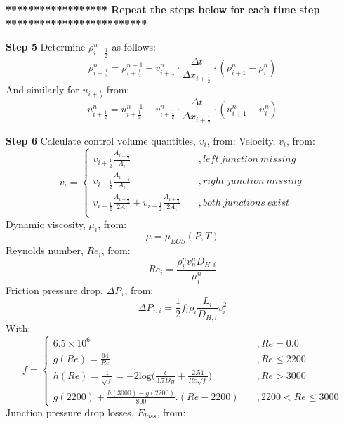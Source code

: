 \documentclass[11pt,letterpaper,titlepage]{article}
\newcommand{\half}{\frac{1}{2}}
\begin{document}
\newpage
\vspace{0.5cm}\noindent
\textbf{****************** Repeat the steps below for each time step *************************}\newline


\vspace{0.5cm}\noindent
\textbf{Step 5}\newline
Determine $\rho_{i+\half}^n$ as follows:
\begin{equation*}
\rho_{i+\half}^n = \rho_{i+\half}^{n-1} - v_{i+\half}^n \cdot \frac{\Delta t}{\Delta x_{i+\half}} \cdot (\rho_{i+1}^n-\rho_i^n)
\end{equation*}
And similarly for $u_{i+\half}$ from:
\begin{equation*}
u_{i+\half}^n = u_{i+\half}^{n-1} - v_{i+\half}^n \cdot \frac{\Delta t}{\Delta x_{i+\half}} \cdot (u_{i+1}^n-u_i^n)
\end{equation*}



\vspace{0.5cm}\noindent
\textbf{Step 6}\newline
Calculate control volume quantities, $v_i$, from:
Velocity, $v_i$, from:
\begin{equation*}
v_i=
\begin{cases}
v_{i+\half} \frac{A_{i+\half}}{A_i} \quad &, left \ junction  \ missing \\
v_{i-\half} \frac{A_{i-\half}}{A_i} \quad &, right \ junction  \ missing \\
v_{i-\half} \frac{A_{i-\half}}{2A_i} + v_{i+\half} \frac{A_{i+\half}}{2A_i} \quad &, both \ junctions  \ exist \\
\end{cases}
\end{equation*}
\newline
Dynamic viscosity, $\mu_i$, from:
\begin{equation*}
\mu=\mu_{EOS}(P,T)
\end{equation*}
\newline
Reynolds number, $Re_i$, from:
\begin{equation*}
Re_i=\frac{\rho_i^n v_n^n D_{H,i}}{\mu_i^n}
\end{equation*}
\newline
Friction pressure drop, $\Delta P_{\tau}$, from:
\begin{equation*}
\Delta P_{\tau,i}=\frac{1}{2} f_i \rho_i \frac{L_i}{D_{H,i}}v_i^2 
\end{equation*}
\newline
With:
\begin{equation*}
f=
\begin{cases}
6.5\times 10^6 &, Re=0.0 \\
g(Re)=\frac{64}{Re} \quad &,Re\le 2200 \\
h(Re)=\frac{1}{\sqrt{f}}=-2\textrm{log}\biggr( \frac{\epsilon}{3.7D_H}  + \frac{2.51}{Re \sqrt{f}}   \biggr)     \quad &,Re>3000 \\
g(2200)+\frac{h(3000)-g(2200)}{800}. (Re-2200)   \quad &, 2200<Re\le 3000
\end{cases}
\end{equation*}
\newline
Junction pressure drop losses, $E_{loss}$, from:
\end{document}
